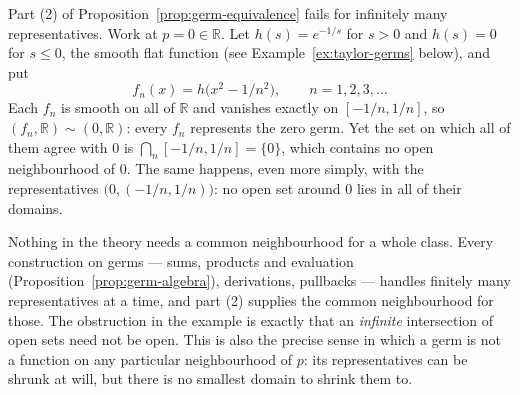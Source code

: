 \documentclass[11pt]{report}
\makeatletter
\newcounter{excounter}[section]
\newcommand{\exlabel}[1]{\edef\@currentlabel{\arabic{section}.\arabic{excounter}}\label{#1}}
\makeatother
\begin{document}
\begin{center}
\end{center}

\begin{exbox}\exlabel{ex:germ-no-common-nbhd}
Part (2) of Proposition~\ref{prop:germ-equivalence} fails for infinitely many representatives. Work at $p = 0 \in \mathbb{R}$. Let $h(s) = e^{-1/s}$ for $s > 0$ and $h(s) = 0$ for $s \le 0$, the smooth flat function (see Example~\ref{ex:taylor-germs} below), and put
\[
f_n(x) = h\big(x^2 - 1/n^2\big), \qquad n = 1, 2, 3, \ldots
\]
Each $f_n$ is smooth on all of $\mathbb{R}$ and vanishes exactly on $[-1/n, 1/n]$, so $(f_n, \mathbb{R}) \sim (0, \mathbb{R})$: every $f_n$ represents the zero germ. Yet the set on which all of them agree with $0$ is $\bigcap_n [-1/n, 1/n] = \{0\}$, which contains no open neighbourhood of $0$. The same happens, even more simply, with the representatives $\big(0, (-1/n, 1/n)\big)$: no open set around $0$ lies in all of their domains.
\end{exbox}

\begin{rembox}\label{rem:abstract-tangent-2}
Nothing in the theory needs a common neighbourhood for a whole class. Every construction on germs --- sums, products and evaluation (Proposition~\ref{prop:germ-algebra}), derivations, pullbacks --- handles finitely many representatives at a time, and part (2) supplies the common neighbourhood for those. The obstruction in the example is exactly that an \emph{infinite} intersection of open sets need not be open. This is also the precise sense in which a germ is not a function on any particular neighbourhood of $p$: its representatives can be shrunk at will, but there is no smallest domain to shrink them to.
\end{rembox}
\end{document}
